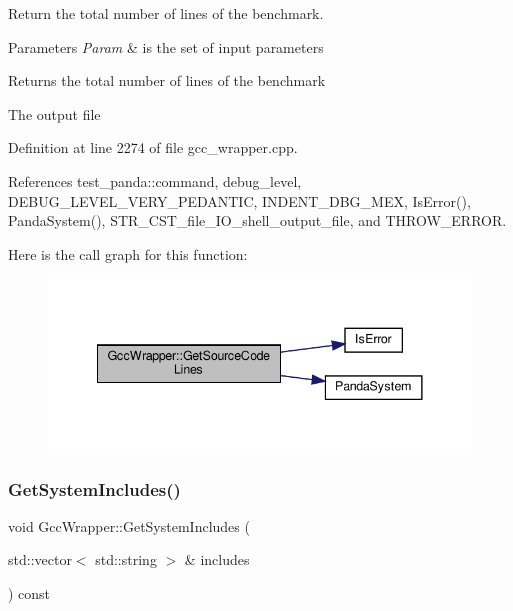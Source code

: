 Return the total number of lines of the benchmark. 


\begin{DoxyParams}{Parameters}
{\em Param} & is the set of input parameters \\
\hline
\end{DoxyParams}
\begin{DoxyReturn}{Returns}
the total number of lines of the benchmark 
\end{DoxyReturn}
The output file 

Definition at line 2274 of file gcc\+\_\+wrapper.\+cpp.



References test\+\_\+panda\+::command, debug\+\_\+level, D\+E\+B\+U\+G\+\_\+\+L\+E\+V\+E\+L\+\_\+\+V\+E\+R\+Y\+\_\+\+P\+E\+D\+A\+N\+T\+IC, I\+N\+D\+E\+N\+T\+\_\+\+D\+B\+G\+\_\+\+M\+EX, Is\+Error(), Panda\+System(), S\+T\+R\+\_\+\+C\+S\+T\+\_\+file\+\_\+\+I\+O\+\_\+shell\+\_\+output\+\_\+file, and T\+H\+R\+O\+W\+\_\+\+E\+R\+R\+OR.

Here is the call graph for this function\+:
\nopagebreak
\begin{figure}[H]
\begin{center}
\leavevmode
\includegraphics[width=341pt]{d4/dbf/classGccWrapper_aaea934b26fbfbd9e8ff802b9efc87b7f_cgraph}
\end{center}
\end{figure}
\mbox{\label{classGccWrapper_a61564c5b5c0731306ac6e722d1826522}} 
\subsubsection{\texorpdfstring{Get\+System\+Includes()}{GetSystemIncludes()}}
{\footnotesize\ttfamily void Gcc\+Wrapper\+::\+Get\+System\+Includes (\begin{DoxyParamCaption}\item[{std\+::vector$<$ std\+::string $>$ \&}]{includes }\end{DoxyParamCaption}) const}



